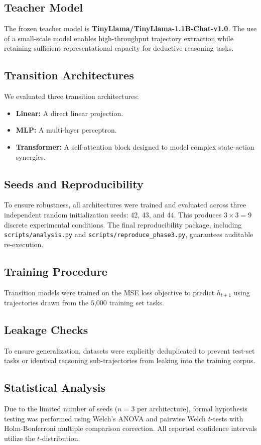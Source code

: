 \documentclass[conference]{IEEEtran}
\begin{document}
\subsection{Teacher Model}
The frozen teacher model is \textbf{TinyLlama/TinyLlama-1.1B-Chat-v1.0}. The use of a small-scale model enables high-throughput trajectory extraction while retaining sufficient representational capacity for deductive reasoning tasks. 

\subsection{Transition Architectures}
We evaluated three transition architectures:
\begin{itemize}
    \item \textbf{Linear:} A direct linear projection.
    \item \textbf{MLP:} A multi-layer perceptron.
    \item \textbf{Transformer:} A self-attention block designed to model complex state-action synergies.
\end{itemize}

\subsection{Seeds and Reproducibility}
To ensure robustness, all architectures were trained and evaluated across three independent random initialization seeds: 42, 43, and 44. This produces $3 \times 3 = 9$ discrete experimental conditions. The final reproducibility package, including \texttt{scripts/analysis.py} and \texttt{scripts/reproduce\_phase3.py}, guarantees auditable re-execution.

\subsection{Training Procedure}
Transition models were trained on the MSE loss objective to predict $h_{t+1}$ using trajectories drawn from the 5,000 training set tasks.

\subsection{Leakage Checks}
To ensure generalization, datasets were explicitly deduplicated to prevent test-set tasks or identical reasoning sub-trajectories from leaking into the training corpus.

\subsection{Statistical Analysis}
Due to the limited number of seeds ($n=3$ per architecture), formal hypothesis testing was performed using Welch's ANOVA and pairwise Welch $t$-tests with Holm-Bonferroni multiple comparison correction. All reported confidence intervals utilize the $t$-distribution.
\end{document}
